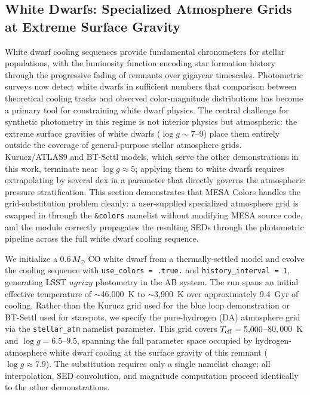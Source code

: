 \documentclass[linenumbers,apj,twocolumn, floatfix]{aastex701}
\begin{document}
\subsection{White Dwarfs: Specialized Atmosphere Grids at Extreme Surface Gravity}
\label{sec:demo_wd}

White dwarf cooling sequences provide fundamental chronometers for stellar populations, with the luminosity function encoding star formation history through the progressive fading of remnants over gigayear timescales.
Photometric surveys now detect white dwarfs in sufficient numbers that comparison between theoretical cooling tracks and observed color-magnitude distributions has become a primary tool for constraining white dwarf physics.
The central challenge for synthetic photometry in this regime is not interior physics but atmospheric: the extreme surface gravities of white dwarfs ($\log g \sim 7$--9) place them entirely outside the coverage of general-purpose stellar atmosphere grids.
Kurucz/ATLAS9 and BT-Settl models, which serve the other demonstrations in this work, terminate near $\log g \approx 5$; applying them to white dwarfs requires extrapolating by several dex in a parameter that directly governs the atmospheric pressure stratification.
This section demonstrates that MESA Colors handles the grid-substitution problem cleanly: a user-supplied specialized atmosphere grid is swapped in through the \texttt{\&colors} namelist without modifying MESA source code, and the module correctly propagates the resulting SEDs through the photometric pipeline across the full white dwarf cooling sequence.

We initialize a $0.6\,M_\odot$ CO white dwarf from a thermally-settled model and evolve the cooling sequence with \texttt{use\_colors = .true.} and \texttt{history\_interval = 1}, generating LSST $ugrizy$ photometry in the AB system.
The run spans an initial effective temperature of $\sim$46{,}000~K to $\sim$3{,}900~K over approximately 9.4~Gyr of cooling.
Rather than the Kurucz grid used for the blue loop demonstration or BT-Settl used for starspots, we specify the \citet{Koester2010} pure-hydrogen (DA) atmosphere grid via the \texttt{stellar\_atm} namelist parameter.
This grid covers $T_{\rm eff} = 5{,}000$--$80{,}000$~K and $\log g = 6.5$--$9.5$, spanning the full parameter space occupied by hydrogen-atmosphere white dwarf cooling at the surface gravity of this remnant ($\log g \approx 7.9$).
The substitution requires only a single namelist change; all interpolation, SED convolution, and magnitude computation proceed identically to the other demonstrations.
\end{document}
